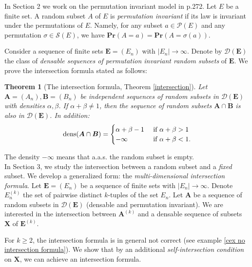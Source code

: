 \documentclass{article}
\DeclareMathOperator{\dens}{dens}
\newcommand{\bs}{\boldsymbol}
\def\Pr{\mathbf{Pr}}
\newtheorem{thmm}{Theorem}
\theoremstyle{remark}
\begin{document}
In Section 2 we work on the permutation invariant model in \cite{Gro93} p.272. Let $E$ be a finite set. A random subset $A$ of $E$ is \textit{permutation invariant} if its law is invariant under the permutations of $E$. Namely, for any subset $a\in \mathcal{P}(E)$ and any permutation $\sigma \in \mathcal{S}(E)$, we have $\Pr(A = a) = \Pr(A = \sigma(a))$.

Consider a sequence of finite sets $\bs E = (E_n)$ with $|E_n|\to\infty$. Denote by $\mathcal{D}(\bs E)$ the class of \textit{densable sequences of permutation invariant random subsets} of $\bs E$. We prove the intersection formula stated as follows: 

\begin{thmm}[The intersection formula, Theorem \ref{intersection}] Let $\bs A = (A_n), \bs B = (B_n)$ be independent sequences of random subsets in $\mathcal{D}(\bs E)$ with densities $\alpha,\beta$. If $\alpha + \beta \neq 1$, then the sequence of random subsets $\bs A\cap \bs B$ is also in $\mathcal{D}(\bs E)$. In addition: 
    \[\dens (\bs A\cap \bs B) = \begin{cases}
        \alpha + \beta - 1 & \textup{ if } \alpha + \beta > 1\\
        -\infty & \textup{ if } \alpha + \beta < 1.
        \end{cases}\]
\end{thmm}

The density $-\infty$ means that a.a.s. the random subset is empty.\\

In Section 3, we study the intersection between a random subset and a \textit{fixed} subset. We develop a generalized form: the \textit{multi-dimensional intersection formula}. Let $\bs E = (E_n)$ be a sequence of finite sets with $|E_n|\to\infty$. Denote $E_n^{(k)}$ the set of pairwise distinct $k$-tuples of the set $E_n$. Let $\bs A$ be a sequence of random subsets in $\mathcal{D}(\bs E)$ (densable and permutation invariant). We are interested in the intersection between $\bs A^{(k)}$ and a densable sequence of subsets $\bs X$ of $\bs E^{(k)}$.

For $k\geq 2$, the intersection formula is in general not correct (see example \ref{cex no intersection formula}). We show that by an additional \textit{self-intersection condition} on $\bs X$, we can achieve an intersection formula.
\end{document}
